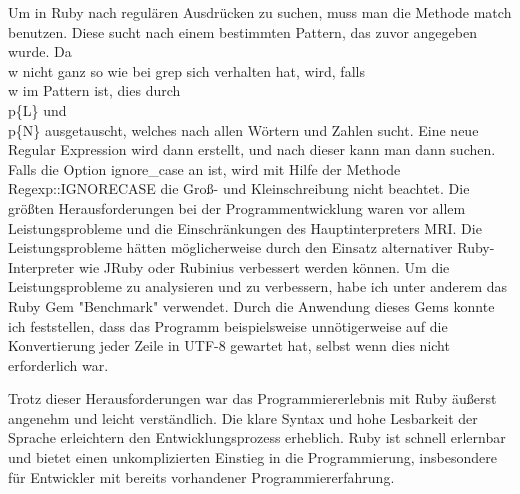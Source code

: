 \documentclass{article}
\begin{document}
Um in Ruby nach regulären Ausdrücken zu suchen, muss man die Methode match benutzen. Diese sucht nach einem bestimmten Pattern, das zuvor angegeben wurde. Da \\w nicht ganz so wie bei grep sich verhalten hat, wird, falls \\w im Pattern ist, dies durch \\p\{L\} und \\p\{N\} ausgetauscht, welches nach allen Wörtern und Zahlen sucht. Eine neue Regular Expression wird dann erstellt, und nach dieser kann man dann suchen. Falls die Option ignore\_case an ist, wird mit Hilfe der Methode Regexp::IGNORECASE die Groß- und Kleinschreibung nicht beachtet.
Die größten Herausforderungen bei der Programmentwicklung waren vor allem Leistungsprobleme und die Einschränkungen des Hauptinterpreters MRI. Die Leistungsprobleme hätten möglicherweise durch den Einsatz alternativer Ruby-Interpreter wie JRuby oder Rubinius verbessert werden können.
Um die Leistungsprobleme zu analysieren und zu verbessern, habe ich unter anderem das Ruby Gem "Benchmark" verwendet. Durch die Anwendung dieses Gems konnte ich feststellen, dass das Programm beispielsweise unnötigerweise auf die Konvertierung jeder Zeile in UTF-8 gewartet hat, selbst wenn dies nicht erforderlich war.

Trotz dieser Herausforderungen war das Programmiererlebnis mit Ruby äußerst angenehm und leicht verständlich. Die klare Syntax und hohe Lesbarkeit der Sprache erleichtern den Entwicklungsprozess erheblich. Ruby ist schnell erlernbar und bietet einen unkomplizierten Einstieg in die Programmierung, insbesondere für Entwickler mit bereits vorhandener Programmiererfahrung.
\end{document}
